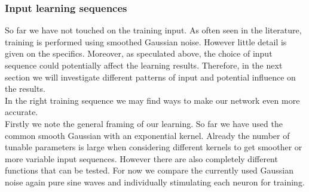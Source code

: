 \subsubsection{Input learning sequences}
So far we have not touched on the training input. As often seen in the literature, training is performed using smoothed Gaussian noise. However little detail is given on the specifics. Moreover, as speculated above, the choice of input sequence could potentially affect the learning results.
Therefore, in the next section we will investigate different patterns of input and potential influence on the results.\\
In the right training sequence we may find ways to make our network even more accurate.\\
Firstly we note the general framing of our learning. So far we have used the common smooth Gaussian with an exponential kernel. Already the number of tunable parameters is large when considering different kernels to get smoother or more variable input sequences. However there are also completely different functions that can be tested. For now we compare the currently used Gaussian noise again pure sine waves and individually stimulating each neuron for training.\\

